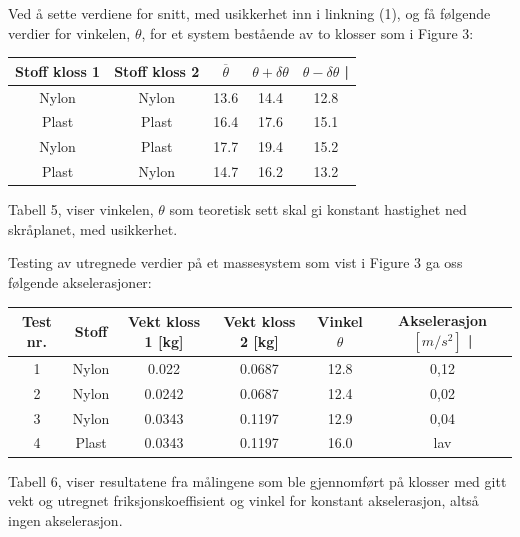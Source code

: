\documentclass[10pt,a4paper]{report}
\begin{document}
Ved å sette verdiene for snitt, med usikkerhet inn i linkning (1), og få følgende verdier for vinkelen, $\theta$, for et system bestående av to klosser som i Figure 3:

\begin{center}
  \begin{tabular}{| c | c | c | c | c |}
    \hline
    Stoff kloss 1 & Stoff kloss 2 & $\overline{\theta}$ & $\theta + \delta\theta$ & $\theta - \delta\theta$ | \\ \hline
    Nylon & Nylon & 13.6 & 14.4 & 12.8 \\ \hline
    Plast & Plast & 16.4 & 17.6 & 15.1 \\ \hline
    Nylon & Plast & 17.7 & 19.4 & 15.2 \\ \hline
    Plast & Nylon & 14.7 & 16.2 & 13.2  \\ \hline
  \end{tabular}
     \begin{tablenotes}
 	\small
 	\item Tabell 5, viser vinkelen, $\theta$ som teoretisk sett skal gi konstant hastighet ned skråplanet, med usikkerhet.
 	\end{tablenotes}
\end{center}
Testing av utregnede verdier på et massesystem som vist i Figure 3 ga oss følgende akselerasjoner:

\begin{center}
  \begin{tabular}{| c | c | c | c | c  | c |}
    \hline
    Test nr. & Stoff & Vekt kloss 1 [kg] & Vekt kloss 2 [kg] & Vinkel $\theta$ & Akselerasjon $[m/s^2]$ | \\ \hline
    1 & Nylon & 0.022 & 0.0687 & 12.8 & 0,12 \\ \hline
    2 & Nylon & 0.0242 & 0.0687 & 12.4 & 0,02 \\ \hline
    3 & Nylon & 0.0343 & 0.1197 & 12.9 & 0,04 \\ \hline
    4 & Plast & 0.0343 & 0.1197 & 16.0 & lav  \\ \hline
  \end{tabular}
     \begin{tablenotes}
 	\small
 	\item Tabell 6, viser resultatene fra målingene som ble gjennomført på klosser med gitt vekt og utregnet friksjonskoeffisient og vinkel for konstant akselerasjon, altså ingen akselerasjon.
 	\end{tablenotes}
\end{center}
\end{document}
